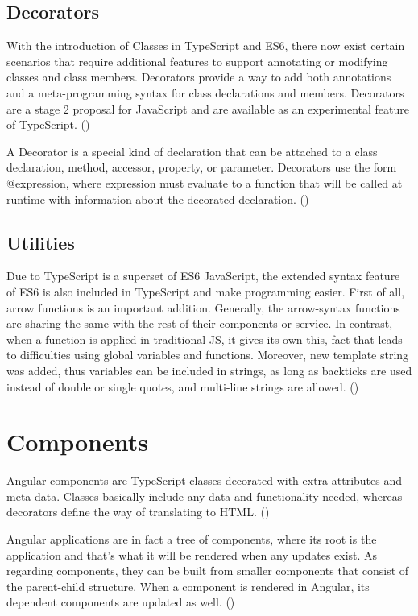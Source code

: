 \subsection{Decorators}

With the introduction of Classes in TypeScript and ES6, there now exist certain scenarios that require additional features to support annotating or modifying classes and class members. Decorators provide a way to add both annotations and a meta-programming syntax for class declarations and members. Decorators are a stage 2 proposal for JavaScript and are available as an experimental feature of TypeScript. (\cite{Typescript})

A Decorator is a special kind of declaration that can be attached to a class declaration, method, accessor, property, or parameter. Decorators use the form @expression, where expression must evaluate to a function that will be called at runtime with information about the decorated declaration. (\cite{Typescript})

\subsection{Utilities}

Due to TypeScript is a superset of ES6 JavaScript, the extended syntax feature of ES6 is also included in TypeScript and make programming easier. First of all, arrow functions is an important addition. Generally, the arrow-syntax functions are sharing the same with the rest of their components or service. In contrast, when a function is applied in traditional JS, it gives its own this, fact that leads to difficulties using global variables and functions. Moreover, new template string was added, thus variables can be included in strings, as long as backticks are used instead of double or single quotes, and multi-line strings are allowed. (\cite{murray2018ng}) \par

\section{Components}

Angular components are TypeScript classes decorated with extra attributes and meta-data. Classes basically include any data and functionality needed, whereas decorators define the way of translating to HTML. (\cite{angularUpandRunning}) \par

Angular applications are in fact a tree of components, where its root is the application and that's what it will be rendered when any updates exist. As regarding components, they can be built from smaller components that consist of the parent-child structure. When a component is rendered in Angular, its dependent components are updated as well. (\cite{murray2018ng}) \par

